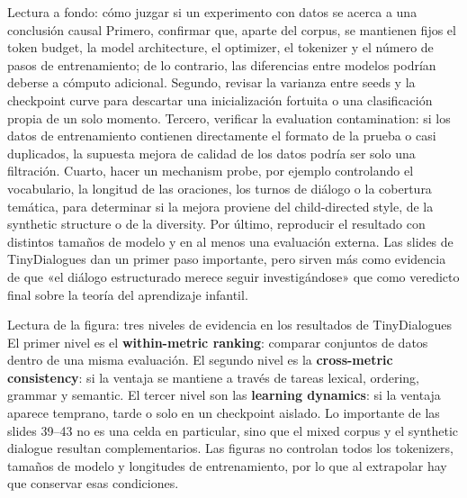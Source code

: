 \begin{knowledgebox}{Lectura a fondo: cómo juzgar si un experimento con datos se acerca a una conclusión causal}
Primero, confirmar que, aparte del corpus, se mantienen fijos el token budget, la model architecture, el optimizer, el tokenizer y el número de pasos de entrenamiento; de lo contrario, las diferencias entre modelos podrían deberse a cómputo adicional. Segundo, revisar la varianza entre seeds y la checkpoint curve para descartar una inicialización fortuita o una clasificación propia de un solo momento. Tercero, verificar la evaluation contamination: si los datos de entrenamiento contienen directamente el formato de la prueba o casi duplicados, la supuesta mejora de calidad de los datos podría ser solo una filtración. Cuarto, hacer un mechanism probe, por ejemplo controlando el vocabulario, la longitud de las oraciones, los turnos de diálogo o la cobertura temática, para determinar si la mejora proviene del child-directed style, de la synthetic structure o de la diversity. Por último, reproducir el resultado con distintos tamaños de modelo y en al menos una evaluación externa. Las slides de TinyDialogues dan un primer paso importante, pero sirven más como evidencia de que «el diálogo estructurado merece seguir investigándose» que como veredicto final sobre la teoría del aprendizaje infantil.
\end{knowledgebox}






\begin{knowledgebox}{Lectura de la figura: tres niveles de evidencia en los resultados de TinyDialogues}
El primer nivel es el \textbf{within-metric ranking}: comparar conjuntos de datos dentro de una misma evaluación. El segundo nivel es la \textbf{cross-metric consistency}: si la ventaja se mantiene a través de tareas lexical, ordering, grammar y semantic. El tercer nivel son las \textbf{learning dynamics}: si la ventaja aparece temprano, tarde o solo en un checkpoint aislado. Lo importante de las slides 39--43 no es una celda en particular, sino que el mixed corpus y el synthetic dialogue resultan complementarios. Las figuras no controlan todos los tokenizers, tamaños de modelo y longitudes de entrenamiento, por lo que al extrapolar hay que conservar esas condiciones.
\end{knowledgebox}

